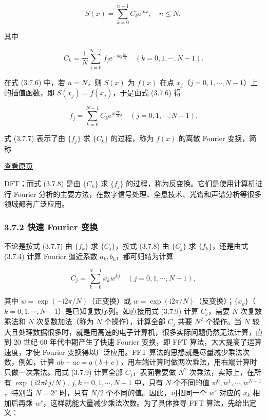 \documentclass[
  10pt,
  fontset=fandol]{ctexart}
\begin{document}
\[
S(x)=\sum_{k=0}^{n-1}C_k\mathrm e^{\mathrm ikx},\quad n\leqslant N,\tag{3.7.6}
\]

其中

\[
C_k=\frac1N\sum_{j=0}^{N-1}f_j\mathrm e^{-\mathrm ikj\frac{2\pi}{N}}\quad(k=0,1,\cdots,N-1).\tag{3.7.7}
\]

在式 (3.7.6) 中，若 \(n=N\)，则 \(S(x)\) 为 \(f(x)\) 在点 \(x_j\)（\(j=0,1,\cdots,N-1\)）上的插值函数，即 \(S(x_j)=f(x_j)\)，于是由式 (3.7.6) 得

\[
f_j=\sum_{k=0}^{N-1}C_k\mathrm e^{\mathrm ik\frac{2\pi}{N}j}\quad(j=0,1,\cdots,N-1).\tag{3.7.8}
\]

式 (3.7.7) 表示了由 \(\{f_j\}\) 求 \(\{C_k\}\) 的过程，称为 \(f(x)\) 的离散 Fourier 变换，简称

\href{../../source-images/pdf-087.jpeg}{查看原页}

DFT；而式 (3.7.8) 是由 \(\{C_k\}\) 求 \(\{f_j\}\) 的过程，称为反变换。它们是使用计算机进行 Fourier 分析的主要方法，在数字信号处理、全息技术、光谱和声谱分析等很多领域都有广泛应用。

\subsubsection{3.7.2 快速 Fourier 变换}\label{ux5febux901f-fourier-ux53d8ux6362}

不论是按式 (3.7.7) 由 \(\{f_k\}\) 求 \(\{C_j\}\)，按式 (3.7.8) 由 \(\{C_j\}\) 求 \(\{f_k\}\)，还是由式 (3.7.4) 计算 Fourier 逼近系数 \(a_k,b_k\)，都可归结为计算

\[
C_j=\sum_{k=0}^{N-1}x_kw^{kj}\quad(j=0,1,\cdots,N-1),\tag{3.7.9}
\]

其中 \(w=\exp(-\mathrm i2\pi/N)\)（正变换）或 \(w=\exp(\mathrm i2\pi/N)\)（反变换）；\(\{x_k\}\)（\(k=0,1,\cdots,N-1\)）是已知复数序列。如直接用式 (3.7.9) 计算 \(C_j\)，需要 \(N\) 次复数乘法和 \(N\) 次复数加法（称为 \(N\) 个操作），计算全部 \(C_j\) 共要 \(N^2\) 个操作。当 \(N\) 较大且处理数据很多时，就是用高速的电子计算机，很多实际问题仍然无法计算，直到 20 世纪 60 年代中期产生了快速 Fourier 变换，即 FFT 算法，大大提高了运算速度，才使 Fourier 变换得以广泛应用。FFT 算法的思想就是尽量减少乘法次数，例如，计算 \(ab+ac=a(b+c)\)，用左端计算时做两次乘法，用右端计算时只做一次乘法。用式 (3.7.9) 计算全部 \(C_j\)，表面看要做 \(N^2\) 次乘法，实际上，在所有 \(\exp(\mathrm i2\pi kj/N),\allowbreak \ j,\allowbreak k=0,\allowbreak 1,\allowbreak \cdots,\allowbreak N-1\) 中，只有 \(N\) 个不同的值 \(w^0,w^1,\cdots,w^{N-1}\)，特别当 \(N=2^p\) 时，只有 \(N/2\) 个不同的值。因此，可把同一个 \(w^r\) 对应的 \(x_k\) 相加后再乘 \(w^r\)，这样就能大量减少乘法次数。为了具体推导 FFT 算法，先给出定义：
\end{document}
